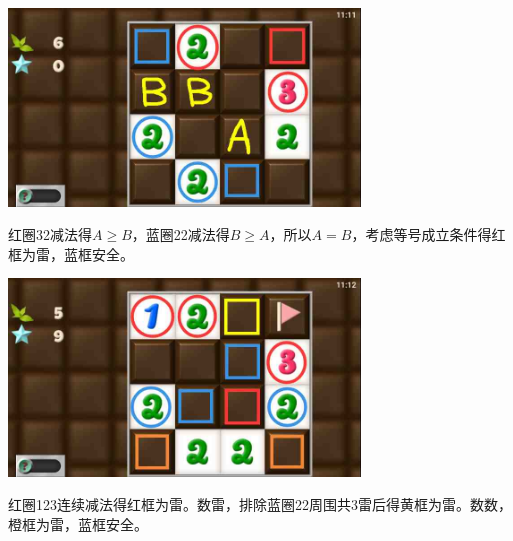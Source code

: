 \subsection{} %
\begin{center}
    \includegraphics[width=0.7\textwidth]{puzzlelow/128-1.jpg}
\end{center}
红圈32减法得$A\ge B$，蓝圈22减法得$B\ge A$，所以$A=B$，考虑等号成立条件得红框为雷，蓝框安全。
\begin{center}
    \includegraphics[width=0.7\textwidth]{puzzlelow/128-2.jpg}
\end{center}
红圈123连续减法得红框为雷。数雷，排除蓝圈22周围共3雷后得黄框为雷。数数，橙框为雷，蓝框安全。

